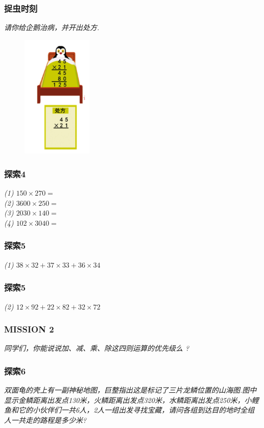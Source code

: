 \begin{frame}
    \frametitle{捉虫时刻}
    \textit{请你给企鹅治病，并开出处方.}
    \begin{figure}[H] 
        \centering
        \includegraphics[width=0.3\textwidth]{./pics/Chapter_4/zhuochong.png}
    \end{figure}
\end{frame}

\begin{frame}
    \frametitle{探索4}
    \textit{(1) $150\times 270 = $\\
        (2) $3600\times 250 = $\\
        (3) $2030\times 140 = $\\
        (4) $102\times 3040 = $}
\end{frame}

\begin{frame}
    \frametitle{探索5}
    \textit{(1) $38\times 32 + 37\times 33 + 36\times 34$}
\end{frame}

\begin{frame}
    \frametitle{探索5}
    \textit{(2) $12\times 92 + 22\times 82 + 32\times 72$}
\end{frame}

\begin{frame}
    \frametitle{MISSION 2}
    \textit{同学们，你能说说加、减、乘、除这四则运算的优先级么 ?}
\end{frame}

\begin{frame}
    \frametitle{探索6}
    \textit{双面龟的壳上有一副神秘地图，巨整指出这是标记了三片龙鳞位置的山海图.图中显示金鳞距离出发点130米，火鳞距离出发点320米，水鳞距离出发点250米，小鲤鱼和它的小伙伴们一共6人，2人一组出发寻找宝藏，请问各组到达目的地时全组人一共走的路程是多少米?}
\end{frame}


